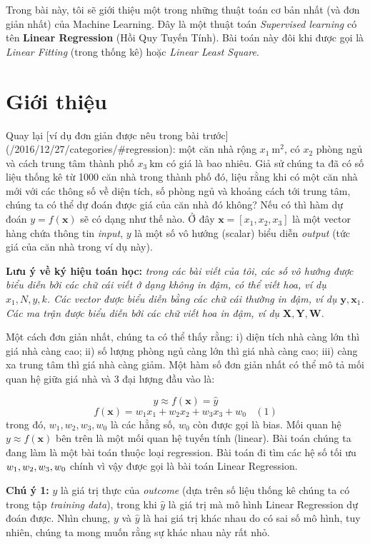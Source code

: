 
Trong bài này, tôi sẽ giới thiệu một trong những thuật toán cơ bản nhất (và đơn giản nhất) của Machine Learning. Đây là một thuật toán \textit{Supervised learning} có tên \textbf{Linear Regression} (Hồi Quy Tuyến Tính). Bài toán này đôi khi được gọi là \textit{Linear Fitting} (trong thống kê) hoặc \textit{Linear Least Square}.


\section{Giới thiệu}
Quay lại [ví dụ đơn giản được nêu trong bài trước](/2016/12/27/categories/#regression): một căn nhà rộng $x_1 ~ \text{m}^2$, có $x_2$ phòng ngủ và cách trung tâm thành phố $x_3~ \text{km}$ có giá là bao nhiêu. Giả sử chúng ta đã có số liệu thống kê từ 1000 căn nhà trong thành phố đó, liệu rằng khi có một căn nhà mới với các thông số về diện tích, số phòng ngủ và khoảng cách tới trung tâm, chúng ta có thể dự đoán được giá của căn nhà đó không? Nếu có thì hàm dự đoán $y = f(\mathbf{x}) $ sẽ có dạng như thế nào. Ở đây $\mathbf{x} = [x_1, x_2, x_3] $ là một vector hàng chứa thông tin \textit{input}, $y$ là một số vô hướng (scalar) biểu diễn \textit{output} (tức giá của căn nhà trong ví dụ này).

\textbf{Lưu ý về ký hiệu toán học:} \textit{trong các bài viết của tôi, các số vô hướng được biểu diễn bởi các chữ cái viết ở dạng không in đậm, có thể viết hoa, ví dụ $x_1, N, y, k$. Các vector được biểu diễn bằng các chữ cái thường in đậm, ví dụ $\mathbf{y}, \mathbf{x}_1 $. Các ma trận được biểu diễn bởi các chữ viết hoa in đậm, ví dụ $\mathbf{X, Y, W} $.}

Một cách đơn giản nhất, chúng ta có thể thấy rằng: i) diện tích nhà càng lớn thì giá nhà càng cao; ii) số lượng phòng ngủ càng lớn thì giá nhà càng cao; iii) càng xa trung tâm thì giá nhà càng giảm. Một hàm số đơn giản nhất có thể mô tả mối quan hệ giữa giá nhà và 3 đại lượng đầu vào là: 


$$y \approx  f(\mathbf{x}) = \hat{y}$$
$$f(\mathbf{x}) =w_1 x_1 + w_2 x_2 + w_3 x_3 + w_0 ~~~~ (1)$$
trong đó, $w_1, w_2, w_3, w_0$ là các hằng số,  $w_0$ còn được gọi là bias. Mối quan hệ $y \approx f(\mathbf{x})$ bên trên là một mối quan hệ tuyến tính (linear). Bài toán chúng ta đang làm là một bài toán thuộc loại regression. Bài toán đi tìm các hệ số tối ưu $ \\{w_1, w_2, w_3, w_0 \\}$ chính vì vậy được gọi là bài toán Linear Regression. 

\textbf{Chú ý 1:} $y$ là giá trị thực của \textit{outcome} (dựa trên số liệu thống kê chúng ta có trong tập \textit{training data}), trong khi $\hat{y}$ là giá trị mà mô hình Linear Regression dự đoán được. Nhìn chung, $y$ và $\hat{y}$ là hai giá trị khác nhau do có sai số mô hình, tuy nhiên, chúng ta mong muốn rằng sự khác nhau này rất nhỏ.

